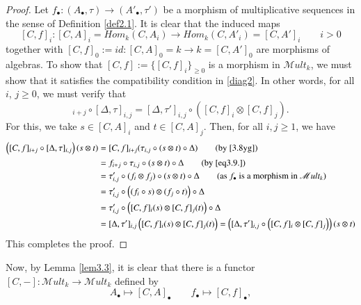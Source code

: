 \documentclass[10pt, colorlinks]{article}
\numberwithin{equation}{section} \DeclareMathSizes{2}{10}{12}{13}
\begin{document}
     \begin{proof} Let $f_\bullet:(A_\bullet,\tau)\longrightarrow (A'_\bullet,\tau')$ be a morphism of multiplicative sequences in the sense of Definition \ref{def2.1}. It is clear that the induced maps \begin{equation}\label{eq3.9.} [C,f]_i:[C,A]_i=Hom_k(C,A_i)\longrightarrow Hom_k(C,A'_i)=[C,A']_i \qquad i>0
     \end{equation} together with $[C,f]_0:=id:[C,A]_0=k\longrightarrow k=[C,A']_0$ are morphisms of algebras. To show that $[C,f]:=\{[C,f]_i\}_{\geq 0} $ is a morphism in $\mathscr Mult_k$, we must show that it satisfies the compatibility condition in \eqref{diag2}. In other words, for all $i$, $j\geq 0$, we must verify that
        \begin{equation}
            [C,f]_{i+j}\circ [\Delta,\tau]_{i,j}=[\Delta,\tau']_{i,j}\circ \left([C,f]_i\otimes [C,f]_j\right).
        \end{equation}
     For this, we take  $s\in[C,A]_i$ and $t\in[C,A]_j$. Then, for all $i,j\geq 1$, we have 
       \begin{align*}
           \left([C,f]_{i+j}\circ [\Delta,\tau]_{i,j}\right)(s\otimes t)
           &=[C,f]_{i+j}( \tau_{i,j}\circ(s\otimes t)\circ \Delta)\tag{by \eqref{3.8yg}}\\
           &=f_{i+j}\circ \tau_{i,j}\circ (s\otimes t)\circ\Delta\tag{by \eqref{eq3.9.}}\\
           &=\tau'_{i,j}\circ(f_i\otimes f_j)\circ (s\otimes t)\circ\Delta\tag{as $f_\bullet$ is a morphism in $\mathscr Mult_k$}\\
           &=\tau'_{i,j}\circ\left((f_i\circ s)\otimes(f_j\circ t)\right)\circ \Delta\\
           &=\tau'_{i,j}\circ\left([C,f]_i(s)\otimes[C,f]_j(t)\right)\circ \Delta\\
           &=[\Delta,\tau']_{i,j}\left([C,f]_i(s)\otimes[C,f]_j(t)\right)
           =\left([\Delta,\tau']_{i,j}\circ \left([C,f]_i\otimes [C,f]_j\right)\right)(s\otimes t)
       \end{align*}
       This completes the proof.
     \end{proof}
     \iffalse
     Now, by Lemma \ref{lem3.3}, it is clear that there is a functor 
     $ [C,-]:\mathscr{M}ult_k\longrightarrow \mathscr{M}ult_k$ defined by
        \begin{equation}\label{eqHom}
            A_\bullet\longmapsto  [C,A]_\bullet\qquad f_\bullet\longmapsto  [C,f]_\bullet,
        \end{equation}
\end{document}
